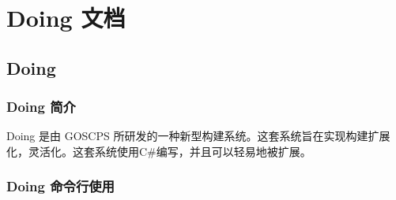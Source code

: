 \chapter{Doing 文档}
\section{Doing}
\subsection{Doing 简介}

Doing 是由 GOSCPS 所研发的一种新型构建系统。这套系统旨在实现构建扩展化，灵活化。这套系统使用C\#{}编写，并且可以轻易地被扩展。

\subsection{Doing 命令行使用}




